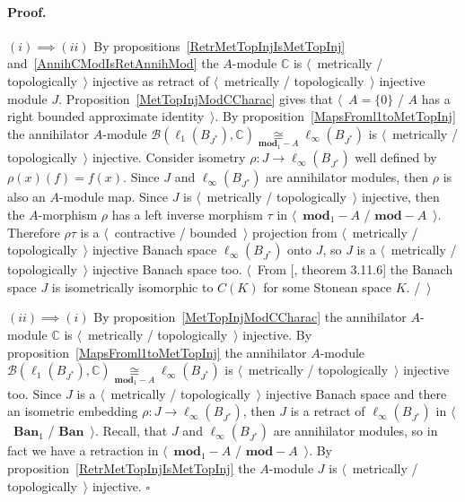 \documentclass[12pt]{article}
\newcommand{\isom}[1]{\mathop{\mathbin{\cong}}\limits_{#1}}
\renewenvironment{proof}{\paragraph{Proof.}}{\hfill$\square$\medskip}
\begin{document}
\begin{proof} $(i) \implies (ii)$  By
    propositions~\ref{RetrMetTopInjIsMetTopInj} and~\ref{AnnihCModIsRetAnnihMod}
    the $A$-module $\mathbb{C}$ is $\langle$~metrically /
    topologically~$\rangle$ injective as retract of $\langle$~metrically /
    topologically~$\rangle$ injective module $J$.
    Proposition~\ref{MetTopInjModCCharac} gives that $\langle$~$A=\{0\}$ / $A$
    has a right bounded approximate identity~$\rangle$. By
    proposition~\ref{MapsFroml1toMetTopInj} the annihilator $A$-module
    $\mathcal{B}(\ell_1(B_{J^*}),\mathbb{C})
        \isom{\mathbf{mod}_1-A}
        \ell_\infty(B_{J^*})$ is $\langle$~metrically / topologically~$\rangle$
    injective. Consider isometry $\rho:J\to\ell_\infty(B_{J^*})$ well defined by
    $\rho(x)(f)=f(x)$. Since $J$ and $\ell_\infty(B_{J^*})$ are annihilator
    modules, then $\rho$ is also an $A$-module map. Since $J$ is
    $\langle$~metrically / topologically~$\rangle$ injective, then the
    $A$-morphism $\rho$ has a left inverse morphism $\tau$ in
    $\langle$~$\mathbf{mod}_1-A$ / $\mathbf{mod}-A$~$\rangle$. 
    Therefore $\rho\tau$ is a $\langle$~contractive / bounded~$\rangle$ 
    projection from $\langle$~metrically / topologically~$\rangle$ injective 
    Banach space $\ell_\infty(B_{J^*})$ onto $J$, so $J$ is a 
    $\langle$~metrically / topologically~$\rangle$ injective Banach space too. 
    $\langle$~From [\cite{LaceyIsomThOfClassicBanSp}, theorem 3.11.6] 
    the Banach space $J$ is isometrically isomorphic to $C(K)$ for some 
    Stonean space $K$. /~$\rangle$

    $(ii)\implies(i)$ By proposition~\ref{MetTopInjModCCharac} the annihilator
    $A$-module $\mathbb{C}$ is $\langle$~metrically / topologically~$\rangle$
    injective. By proposition~\ref{MapsFroml1toMetTopInj} the annihilator
    $A$-module $\mathcal{B}(\ell_1(B_{J^*}),\mathbb{C})
        \isom{\mathbf{mod}_1-A}
        \ell_\infty(B_{J^*})$ is $\langle$~metrically / topologically~$\rangle$
    injective too. Since $J$ is a $\langle$~metrically / topologically~$\rangle$
    injective Banach space and there an isometric embedding $\rho:J\to
        \ell_\infty(B_{J^*})$, then $J$ is a retract of $\ell_\infty(B_{J^*})$ 
    in $\langle$~$\mathbf{Ban}_1$ / $\mathbf{Ban}$~$\rangle$. Recall, that $J$ 
    and $\ell_\infty(B_{J^*})$ are annihilator modules, so in fact we have a
    retraction in $\langle$~$\mathbf{mod}_1-A$ / $\mathbf{mod}-A$~$\rangle$. By
    proposition~\ref{RetrMetTopInjIsMetTopInj} the $A$-module $J$ is
    $\langle$~metrically / topologically~$\rangle$ injective.
\end{proof}
\end{document}
